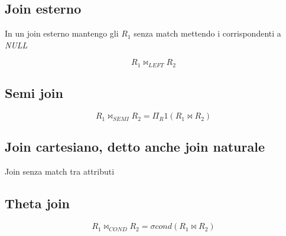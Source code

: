 \subsection{Join esterno}

In un join esterno mantengo gli $R_1$ senza match mettendo i corrispondenti a \textit{NULL}

\begin{exmp}
\[ R_1 \bowtie _{LEFT} R_2  \]
\end{exmp}

\subsection{Semi join}

\begin{exmp}
\[ R_1 \bowtie _{SEMI} R_2 = \Pi _R1\left( R_1 \bowtie R_2 \right)   \]
\end{exmp}

\subsection{Join cartesiano, detto anche join naturale}

Join senza match tra attributi

\subsection{Theta join}
\[ R_1 \bowtie _{COND} R_2 = \sigma cond \left(R_1 \bowtie R_2 \right) \]
